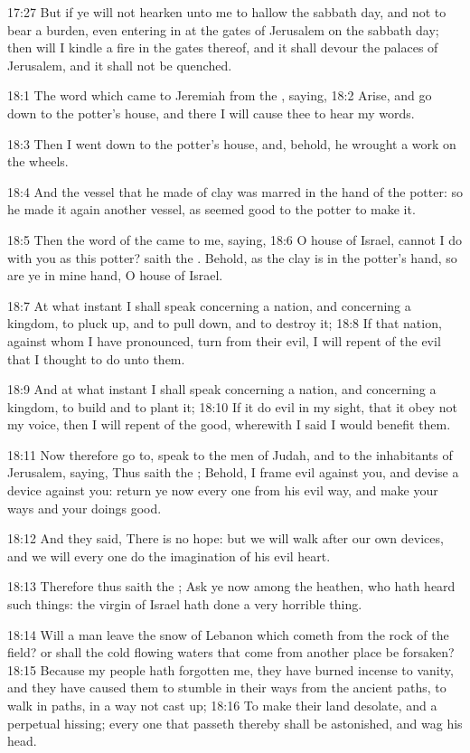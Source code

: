 17:27 But if ye will not hearken unto me to hallow the sabbath day,
and not to bear a burden, even entering in at the gates of Jerusalem
on the sabbath day; then will I kindle a fire in the gates thereof,
and it shall devour the palaces of Jerusalem, and it shall not be
quenched.

18:1 The word which came to Jeremiah from the \LORD, saying, 18:2
Arise, and go down to the potter's house, and there I will cause thee
to hear my words.

18:3 Then I went down to the potter's house, and, behold, he wrought a
work on the wheels.

18:4 And the vessel that he made of clay was marred in the hand of the
potter: so he made it again another vessel, as seemed good to the
potter to make it.

18:5 Then the word of the \LORD came to me, saying, 18:6 O house of
Israel, cannot I do with you as this potter? saith the \LORD. Behold,
as the clay is in the potter's hand, so are ye in mine hand, O house
of Israel.

18:7 At what instant I shall speak concerning a nation, and concerning
a kingdom, to pluck up, and to pull down, and to destroy it; 18:8 If
that nation, against whom I have pronounced, turn from their evil, I
will repent of the evil that I thought to do unto them.

18:9 And at what instant I shall speak concerning a nation, and
concerning a kingdom, to build and to plant it; 18:10 If it do evil in
my sight, that it obey not my voice, then I will repent of the good,
wherewith I said I would benefit them.

18:11 Now therefore go to, speak to the men of Judah, and to the
inhabitants of Jerusalem, saying, Thus saith the \LORD; Behold, I frame
evil against you, and devise a device against you: return ye now every
one from his evil way, and make your ways and your doings good.

18:12 And they said, There is no hope: but we will walk after our own
devices, and we will every one do the imagination of his evil heart.

18:13 Therefore thus saith the \LORD; Ask ye now among the heathen, who
hath heard such things: the virgin of Israel hath done a very horrible
thing.

18:14 Will a man leave the snow of Lebanon which cometh from the rock
of the field? or shall the cold flowing waters that come from another
place be forsaken?  18:15 Because my people hath forgotten me, they
have burned incense to vanity, and they have caused them to stumble in
their ways from the ancient paths, to walk in paths, in a way not cast
up; 18:16 To make their land desolate, and a perpetual hissing; every
one that passeth thereby shall be astonished, and wag his head.

